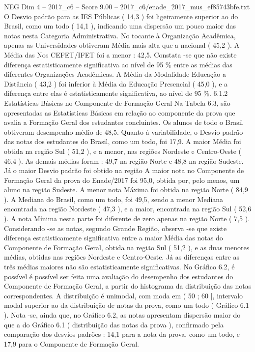 \begin{textsample}{NEG Dim 4 – 2017\_c6 – Score 9.00 – 2017\_c6/enade\_2017\_mus\_ef85743bfe.txt}
O Desvio padrão para as IES Públicas ( 14,3 ) foi ligeiramente superior ao do Brasil, como um todo ( 14,1 ), indicando uma dispersão um pouco maior das notas nesta Categoria Administrativa.
No tocante à Organização Acadêmica, apenas as Universidades obtiveram Média mais alta que a nacional ( 45,2 ).
A Média das Nos CEFET/IFET foi a menor : 42,5.
Constata -se que não existe diferença estatisticamente significativa ao nível de 95 \% entre as médias das diferentes Organizações Acadêmicas.
A Média da Modalidade Educação a Distância ( 43,2 ) foi inferior à Média da Educação Presencial ( 45,0 ), e a diferença entre elas é estatisticamente significativa, ao nível de 95 \%. 6.1.2 Estatísticas Básicas no Componente de Formação Geral Na Tabela 6.3, são apresentadas as Estatísticas Básicas em relação ao componente da prova que avalia a Formação Geral dos estudantes concluintes.
Os alunos de todo o Brasil obtiveram desempenho médio de 48,5.
Quanto à variabilidade, o Desvio padrão das notas dos estudantes do Brasil, como um todo, foi 17,9.
A maior Média foi obtida na região Sul ( 51,2 ), e a menor, nas regiões Nordeste e Centro-Oeste ( 46,4 ).
As demais médias foram : 49,7 na região Norte e 48,8 na região Sudeste.
Já o maior Desvio padrão foi obtido na região A maior nota no Componente de Formação Geral da prova do Enade/2017 foi 95,0, obtida por, pelo menos, um aluno na região Sudeste.
A menor nota Máxima foi obtida na região Norte ( 84,9 ).
A Mediana do Brasil, como um todo, foi 49,5, sendo a menor Mediana encontrada na região Nordeste ( 47,3 ), e a maior, encontrada na região Sul ( 52,6 ).
A nota Mínima nesta parte foi diferente de zero apenas na região Norte ( 7,5 ).
Considerando -se as notas, segundo Grande Região, observa -se que existe diferença estatisticamente significativa entre a maior Média das notas do Componente de Formação Geral, obtida na região Sul ( 51,2 ), e as duas menores médias, obtidas nas regiões Nordeste e Centro-Oeste.
Já as diferenças entre as três médias maiores não são estatisticamente significativas.
No Gráfico 6.2, é possível é possível ser feita uma avaliação do desempenho dos estudantes do Componente de Formação Geral, a partir do histograma da distribuição das notas correspondentes.
A distribuição é unimodal, com moda em ( 50 ; 60 ], intervalo modal superior ao da distribuição de notas da prova, como um todo ( Gráfico 6.1 ).
Nota -se, ainda que, no Gráfico 6.2, as notas apresentam dispersão maior do que a do Gráfico 6.1 ( distribuição das notas da prova ), confirmado pela comparação dos desvios padrões : 14,1 para a nota da prova, como um todo, e 17,9 para o Componente de Formação Geral.

\end{textsample}
